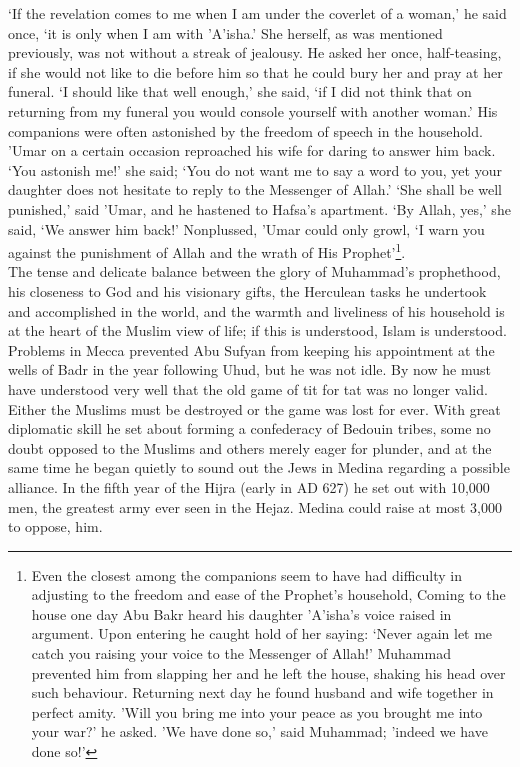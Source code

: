 \documentclass[10pt, twoside]{book}
\begin{document}
`If the revelation comes to me when I am under the coverlet of a woman,' he said once, `it is only 
when I am with 'A'isha.' She herself, as was mentioned previously, was not without a streak of 
jealousy. He asked her once, half-teasing, if she would not like to die before him so that he could 
bury her and pray at her funeral. `I should like that well enough,' she said, `if I did not think 
that on returning from my funeral you would console yourself with another woman.' His companions were 
often astonished by the freedom of speech in the household. 'Umar on a certain occasion reproached 
his wife for daring to answer him back. `You astonish me!' she said; `You do not want me to say a 
word to you, yet your daughter does not hesitate to reply to the Messenger of Allah.' `She shall be 
well punished,' said 'Umar, and he hastened to Hafsa's apartment. `By Allah, yes,' she said, `We 
answer him back!' Nonplussed, 'Umar could only growl, `I warn you against the punishment of Allah and 
the wrath of His Prophet'\footnote{Even the closest among the companions seem to have had difficulty in adjusting to the freedom and ease of the Prophet's household, Coming to the house one day Abu Bakr heard his daughter 'A'isha's voice raised in argument. Upon entering he caught hold of her saying: `Never again let me catch you raising your voice to the Messenger of Allah!' Muhammad prevented him from slapping her and he left the house, shaking his head over such behaviour. Returning next day he found husband and wife together in perfect amity. 'Will you bring me into your peace as you brought me into your war?' he asked. 'We have done so,' said Muhammad; 'indeed we have done so!' }.\\

The tense and delicate balance between the glory of Muhammad's prophethood, his closeness to God and 
his visionary gifts, the Herculean tasks he undertook and accomplished in the world, and the warmth 
and liveliness of his household is at the heart of the Muslim view of life; if this is understood, 
Islam is understood. \\

Problems in Mecca prevented Abu Sufyan from keeping his appointment at the wells of Badr in the year 
following Uhud, but he was not idle. By now he must have understood very well that the old game of 
tit for tat was no longer valid. Either the Muslims must be destroyed or the game was lost for ever. 
With great diplomatic skill he set about forming a confederacy of Bedouin tribes, some no doubt 
opposed to the Muslims and others merely eager for plunder, and at the same time he began quietly to 
sound out the Jews in Medina regarding a possible alliance. In the fifth year of the Hijra (early in 
AD 627) he set out with 10,000 men, the greatest army ever seen in the Hejaz. Medina could raise at 
most 3,000 to oppose, him. \\
\end{document}
